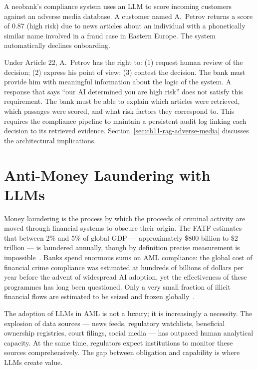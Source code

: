 \begin{example}
\label{ex:gdpr-article22}
A neobank's compliance system uses an LLM to score incoming customers against an adverse media database. A customer named A.~Petrov returns a score of 0.87 (high risk) due to news articles about an individual with a phonetically similar name involved in a fraud case in Eastern Europe. The system automatically declines onboarding.

Under Article 22, A.~Petrov has the right to: (1) request human review of the decision; (2) express his point of view; (3) contest the decision. The bank must provide him with meaningful information about the logic of the system. A response that says ``our AI determined you are high risk'' does not satisfy this requirement. The bank must be able to explain which articles were retrieved, which passages were scored, and what risk factors they correspond to. This requires the compliance pipeline to maintain a persistent audit log linking each decision to its retrieved evidence. Section~\ref{sec:ch11-rag-adverse-media} discusses the architectural implications.
\end{example}

\section{Anti-Money Laundering with LLMs}
\label{sec:ch11-aml-llms}

\begin{context}
Money laundering is the process by which the proceeds of criminal activity are moved through financial systems to obscure their origin. The FATF estimates that between 2\% and 5\% of global GDP --- approximately \$800 billion to \$2 trillion --- is laundered annually, though by definition precise measurement is impossible~\cite{fatf2021aml}. Banks spend enormous sums on AML compliance: the global cost of financial crime compliance was estimated at hundreds of billions of dollars per year before the advent of widespread AI adoption, yet the effectiveness of these programmes has long been questioned. Only a very small fraction of illicit financial flows are estimated to be seized and frozen globally~\citep{fatf2021aml}.

The adoption of LLMs in AML is not a luxury; it is increasingly a necessity. The explosion of data sources --- news feeds, regulatory watchlists, beneficial ownership registries, court filings, social media --- has outpaced human analytical capacity. At the same time, regulators expect institutions to monitor these sources comprehensively. The gap between obligation and capability is where LLMs create value.
\end{context}

